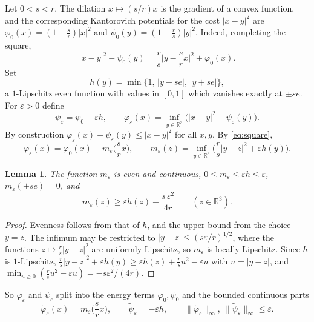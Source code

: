 \documentclass[11pt]{amsart}
\newtheorem{lemma}[theorem]{Lemma}
\theoremstyle{definition}
\newcommand{\RR}{\mathbb{R}}
\begin{document}
Let $0<s<r$. The dilation $x\mapsto(s/r)x$ is the gradient of a convex function, and the corresponding Kantorovich potentials for the cost $|x-y|^2$ are $\varphi_0(x)=(1-\frac sr)|x|^2$ and $\psi_0(y)=(1-\frac rs)|y|^2$. Indeed, completing the square,
\begin{equation}\label{eq:square}
|x-y|^2-\psi_0(y)=\frac rs\Big|y-\frac srx\Big|^2+\varphi_0(x).
\end{equation}
Set
\[
h(y)=\min\{1,\,|y-se|,\,|y+se|\},
\]
a $1$-Lipschitz even function with values in $[0,1]$ which vanishes exactly at $\pm se$. For $\varepsilon>0$ define
\begin{equation}\label{eq:pair}
\psi_\varepsilon=\psi_0-\varepsilon h,\qquad
\varphi_\varepsilon(x)=\inf_{y\in\RR^3}\big(|x-y|^2-\psi_\varepsilon(y)\big).
\end{equation}
By construction $\varphi_\varepsilon(x)+\psi_\varepsilon(y)\le|x-y|^2$ for all $x,y$. By \eqref{eq:square},
\begin{equation}\label{eq:phieps}
\varphi_\varepsilon(x)=\varphi_0(x)+m_\varepsilon\Big(\frac srx\Big),\qquad m_\varepsilon(z)=\inf_{y\in\RR^3}\Big(\frac rs|y-z|^2+\varepsilon h(y)\Big).
\end{equation}

\begin{lemma}\label{lem:m}
The function $m_\varepsilon$ is even and continuous, $0\le m_\varepsilon\le\varepsilon h\le\varepsilon$, $m_\varepsilon(\pm se)=0$, and
\[
m_\varepsilon(z)\ge\varepsilon h(z)-\frac{s\,\varepsilon^2}{4r}\qquad(z\in\RR^3).
\]
\end{lemma}

\begin{proof}
Evenness follows from that of $h$, and the upper bound from the choice $y=z$. The infimum may be restricted to $|y-z|\le(s\varepsilon/r)^{1/2}$, where the functions $z\mapsto\frac rs|y-z|^2$ are uniformly Lipschitz, so $m_\varepsilon$ is locally Lipschitz. Since $h$ is $1$-Lipschitz, $\frac rs|y-z|^2+\varepsilon h(y)\ge\varepsilon h(z)+\frac rsu^2-\varepsilon u$ with $u=|y-z|$, and $\min_{u\ge0}(\frac rsu^2-\varepsilon u)=-s\varepsilon^2/(4r)$.
\end{proof}

So $\varphi_\varepsilon$ and $\psi_\varepsilon$ split into the energy terms $\varphi_0,\psi_0$ and the bounded continuous parts
\begin{equation}\label{eq:tilde}
\tilde\varphi_\varepsilon(x)=m_\varepsilon\Big(\frac srx\Big),\qquad\tilde\psi_\varepsilon=-\varepsilon h,\qquad \|\tilde\varphi_\varepsilon\|_\infty,\ \|\tilde\psi_\varepsilon\|_\infty\le\varepsilon .
\end{equation}
\end{document}
